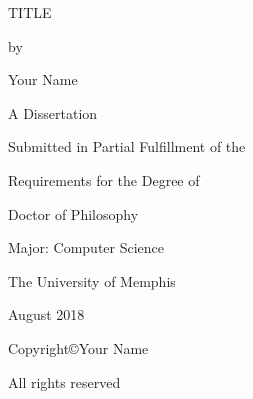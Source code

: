 \documentclass[letterpaper,12pt]{report}
\begin{document}
\thispagestyle{empty}

\begin{center}

\vspace*{1in}

\MakeUppercase{Title}

\vspace{12pt}

by

\vspace{12pt}

Your Name

\vspace{\fill}

A Dissertation

\vspace{12pt} 

Submitted in Partial Fulfillment of the

\vspace{12pt} 

Requirements for the Degree of

\vspace{12pt} 

Doctor of Philosophy

\vspace{48pt}

Major: Computer Science

\vspace{\fill}

The University of Memphis

\vspace{12pt}

August 2018

\vspace{24pt}

\end{center}


\setcounter{page}{1}

\setlength{\parindent}{15pt}

\clearpage


\vspace*{\fill}
\begin{center}

Copyright\copyright Your Name

\vspace{3pt}
All rights reserved

\end{center}
\vspace*{\fill}
\end{document}
